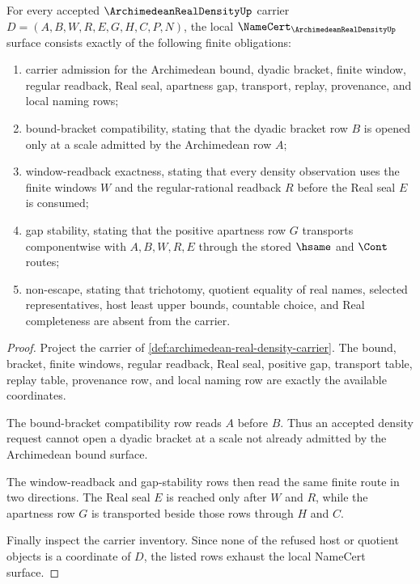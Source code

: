 \begin{theorem}
\label{thm:archimedean-real-density-namecert-obligations}
For every accepted $\ArchimedeanRealDensityUp$ carrier
$D=(A,B,W,R,E,G,H,C,P,N)$, the local
$\NameCert_{\ArchimedeanRealDensityUp}$ surface consists exactly of the
following finite obligations:
\begin{enumerate}
\item carrier admission for the Archimedean bound, dyadic bracket, finite
window, regular readback, Real seal, apartness gap, transport, replay,
provenance, and local naming rows;
\item bound-bracket compatibility, stating that the dyadic bracket row $B$ is
opened only at a scale admitted by the Archimedean row $A$;
\item window-readback exactness, stating that every density observation uses
the finite windows $W$ and the regular-rational readback $R$ before the Real
seal $E$ is consumed;
\item gap stability, stating that the positive apartness row $G$ transports
componentwise with $A,B,W,R,E$ through the stored $\hsame$ and $\Cont$ routes;
\item non-escape, stating that trichotomy, quotient equality of real names,
selected representatives, host least upper bounds, countable choice, and Real
completeness are absent from the carrier.
\end{enumerate}
\end{theorem}
\begin{proof}
Project the carrier of
\autoref{def:archimedean-real-density-carrier}. The bound, bracket, finite
windows, regular readback, Real seal, positive gap, transport table, replay
table, provenance row, and local naming row are exactly the available
coordinates.

The bound-bracket compatibility row reads $A$ before $B$. Thus an accepted
density request cannot open a dyadic bracket at a scale not already admitted
by the Archimedean bound surface.

The window-readback and gap-stability rows then read the same finite route in
two directions. The Real seal $E$ is reached only after $W$ and $R$, while the
apartness row $G$ is transported beside those rows through $H$ and $C$.

Finally inspect the carrier inventory. Since none of the refused host or
quotient objects is a coordinate of $D$, the listed rows exhaust the local
NameCert surface.
\end{proof}

